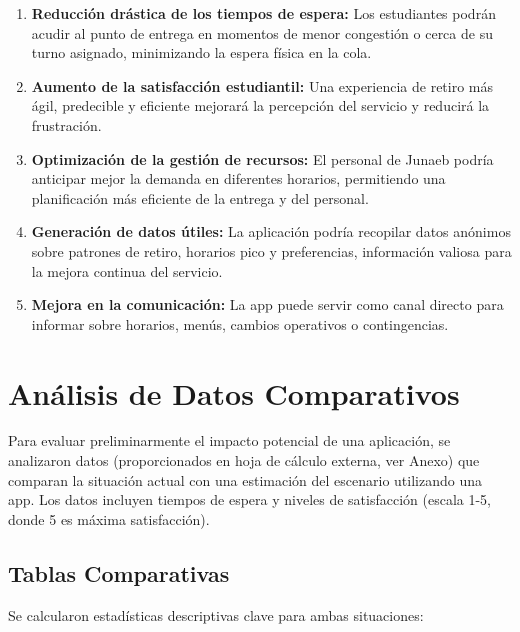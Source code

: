 \documentclass[11pt, a4paper]{article}
\begin{document}
\begin{enumerate}
    \item \textbf{Reducción drástica de los tiempos de espera:} Los estudiantes podrán acudir al punto de entrega en momentos de menor congestión o cerca de su turno asignado, minimizando la espera física en la cola.
    \item \textbf{Aumento de la satisfacción estudiantil:} Una experiencia de retiro más ágil, predecible y eficiente mejorará la percepción del servicio y reducirá la frustración.
    \item \textbf{Optimización de la gestión de recursos:} El personal de Junaeb podría anticipar mejor la demanda en diferentes horarios, permitiendo una planificación más eficiente de la entrega y del personal.
    \item \textbf{Generación de datos útiles:} La aplicación podría recopilar datos anónimos sobre patrones de retiro, horarios pico y preferencias, información valiosa para la mejora continua del servicio.
    \item \textbf{Mejora en la comunicación:} La app puede servir como canal directo para informar sobre horarios, menús, cambios operativos o contingencias.
\end{enumerate}

\section{Análisis de Datos Comparativos}
\label{sec:resultados}

Para evaluar preliminarmente el impacto potencial de una aplicación, se analizaron datos (proporcionados en hoja de cálculo externa, ver Anexo) que comparan la situación actual con una estimación del escenario utilizando una app. Los datos incluyen tiempos de espera y niveles de satisfacción (escala 1-5, donde 5 es máxima satisfacción).

\subsection{Tablas Comparativas}

Se calcularon estadísticas descriptivas clave para ambas situaciones:
\end{document}
